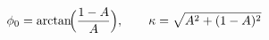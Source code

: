 \documentclass[border=1pt]{standalone}
\begin{document}
\fontsize{14}{16.8}\selectfont
\(\displaystyle \phi_0 = \arctan\!\Bigl(\frac{1-A}{A}\Bigr),\qquad \kappa = \sqrt{A^2 + (1-A)^2}\)
\end{document}
